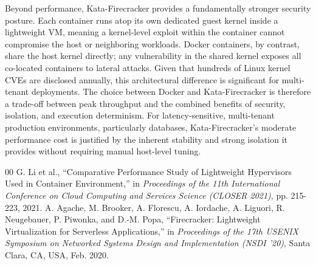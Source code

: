 \documentclass[conference]{IEEEtran}
\begin{document}
Beyond performance, Kata-Firecracker provides a fundamentally stronger security posture. Each container runs atop its own dedicated guest kernel inside a lightweight VM, meaning a kernel-level exploit within the container cannot compromise the host or neighboring workloads. Docker containers, by contrast, share the host kernel directly; any vulnerability in the shared kernel exposes all co-located containers to lateral attacks. Given that hundreds of Linux kernel CVEs are disclosed annually, this architectural difference is significant for multi-tenant deployments. The choice between Docker and Kata-Firecracker is therefore a trade-off between peak throughput and the combined benefits of security, isolation, and execution determinism. For latency-sensitive, multi-tenant production environments, particularly databases, Kata-Firecracker's moderate performance cost is justified by the inherent stability and strong isolation it provides without requiring manual host-level tuning.

\begin{thebibliography}{00}
 G. Li et al., ``Comparative Performance Study of Lightweight Hypervisors Used in Container Environment,'' in \textit{Proceedings of the 11th International Conference on Cloud Computing and Services Science (CLOSER 2021)}, pp. 215-223, 2021.
 A. Agache, M. Brooker, A. Florescu, A. Iordache, A. Liguori, R. Neugebauer, P. Piwonka, and D.-M. Popa, ``Firecracker: Lightweight Virtualization for Serverless Applications,'' in \textit{Proceedings of the 17th USENIX Symposium on Networked Systems Design and Implementation (NSDI '20)}, Santa Clara, CA, USA, Feb. 2020.
\end{thebibliography}
\end{document}
